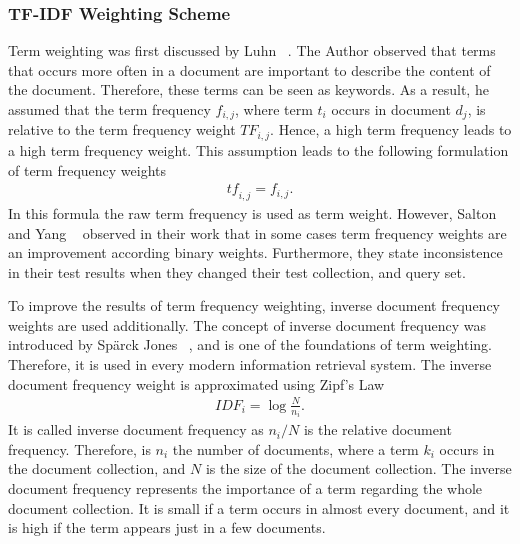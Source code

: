 \subsubsection{TF-IDF Weighting Scheme}
\label{sec:tfidf}

Term weighting was first discussed by Luhn ~\cite{Luhn_statistical-1957}. The Author observed that terms that occurs more often in a document are important to describe the content of the document. Therefore, these terms can be seen as keywords. As a result, he assumed that the term frequency $f_{i, j}$, where term $t_i$ occurs in document $d_j$, is relative to the term frequency weight $TF_{i, j}$. Hence, a high term frequency leads to a high term frequency weight. This assumption leads to the following formulation of term frequency weights
\begin{align}
  \label{raw_tf}
  \mathit{tf}_{i, j} = f_{i, j}.
\end{align}
In this formula the raw term frequency is used as term weight. However, Salton and Yang ~\cite{FT023} observed in their work that in some cases term frequency weights are an improvement according binary weights. Furthermore, they state inconsistence in their test results when they changed their test collection, and query set.

To improve the results of term frequency weighting, inverse document frequency weights are used additionally. The concept of inverse document frequency was introduced by Spärck Jones ~\cite{jones72astatistical}, and is one of the foundations of term weighting. Therefore, it is used in every modern information retrieval system. The inverse document frequency weight is approximated using Zipf's Law ~\cite{zipf1932selected}
\begin{align}
  \label{idf}
  \mathit{IDF}_i = \log \frac{N}{n_i}.
\end{align}
It is called inverse document frequency as $n_i/N$ is the relative document frequency. Therefore, is $n_i$ the number of documents, where a term $k_i$ occurs in the document collection, and $N$ is the size of the document collection. The inverse document frequency represents the importance of a term regarding the whole document collection. It is small if a term occurs in almost every document, and it is high if the term appears just in a few documents.

